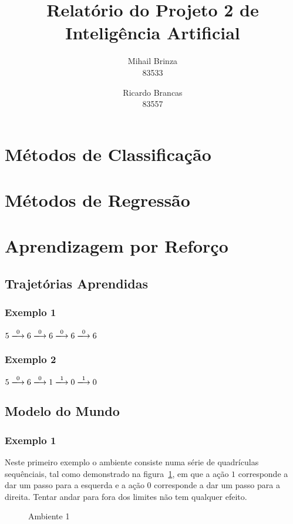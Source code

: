 \documentclass[a4paper,twocolumn]{article}
\title{\LARGE \textbf{Relatório do Projeto 2 de Inteligência Artificial}}
\author{Mihail Brinza \\ \scriptsize 83533 \normalsize \and Ricardo Brancas \\ \scriptsize 83557 \normalsize}
\begin{document}
    \maketitle

    \section{Métodos de Classificação}

    \section{Métodos de Regressão}

    \section{Aprendizagem por Reforço}
    \subsection{Trajetórias Aprendidas}
    \subsubsection{Exemplo 1}
    $ 5 \xlongrightarrow{0} 6 \xlongrightarrow{0} 6 \xlongrightarrow{0} 6 \xlongrightarrow{0} 6 $

    \subsubsection{Exemplo 2}
    $ 5 \xlongrightarrow{0} 6 \xlongrightarrow{0} 1 \xlongrightarrow{1} 0 \xlongrightarrow{1} 0 $


    \subsection{Modelo do Mundo}
    \subsubsection{Exemplo 1}
    Neste primeiro exemplo o ambiente consiste numa série de quadrículas sequênciais, tal como demonstrado na
    figura~\ref{fig:amb1}, em que a ação $1$ corresponde a dar um passo para a esquerda e a ação $0$ corresponde a
    dar um passo para a direita. Tentar andar para fora dos limites não tem qualquer efeito.

    \begin{figure}[H]
        \centering
        \caption{Ambiente 1} \label{fig:amb1}
    \end{figure}
\end{document}
